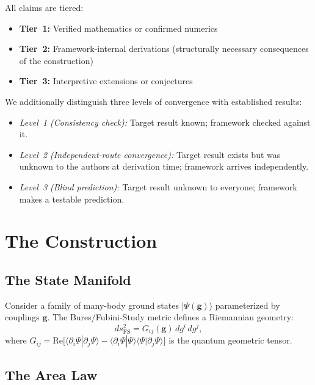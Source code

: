 \documentclass[aps,prd,twocolumn,superscriptaddress,nofootinbib,floatfix]{revtex4-2}
\begin{document}
All claims are tiered:
\begin{itemize}
\item \textbf{Tier~1:} Verified mathematics or confirmed numerics
\item \textbf{Tier~2:} Framework-internal derivations (structurally necessary consequences of the construction)
\item \textbf{Tier~3:} Interpretive extensions or conjectures
\end{itemize}

We additionally distinguish three levels of convergence with established results:
\begin{itemize}
\item \emph{Level~1 (Consistency check):} Target result known; framework checked against it.
\item \emph{Level~2 (Independent-route convergence):} Target result exists but was unknown to the authors at derivation time; framework arrives independently.
\item \emph{Level~3 (Blind prediction):} Target result unknown to everyone; framework makes a testable prediction.
\end{itemize}

\section{The Construction}
\label{sec:construction}

\subsection{The State Manifold}

Consider a family of many-body ground states $|\Psi(\mathbf{g})\rangle$ parameterized by couplings $\mathbf{g}$. The Bures/Fubini-Study metric defines a Riemannian geometry:
\begin{equation}
ds^2_{\mathrm{FS}} = G_{ij}(\mathbf{g})\,dg^i\,dg^j,
\end{equation}
where $G_{ij} = \mathrm{Re}\bigl[\langle\partial_i\Psi|\partial_j\Psi\rangle - \langle\partial_i\Psi|\Psi\rangle\langle\Psi|\partial_j\Psi\rangle\bigr]$ is the quantum geometric tensor.

\subsection{The Area Law}
\end{document}
